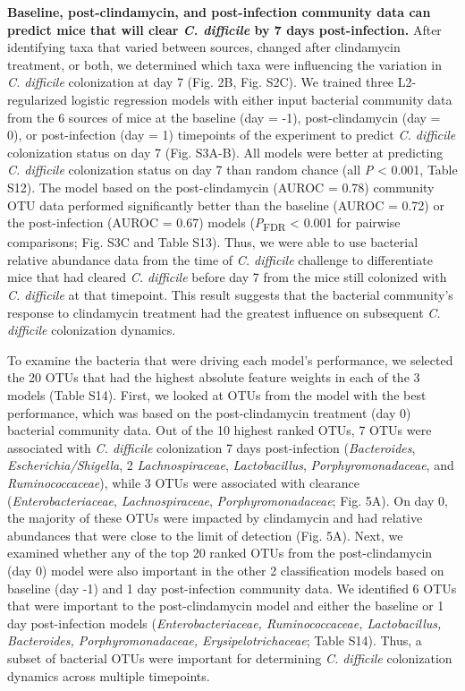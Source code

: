 \documentclass[
  11pt,
]{article}
\begin{document}
\textbf{Baseline, post-clindamycin, and post-infection community data
can predict mice that will clear \emph{C. difficile} by 7 days
post-infection.} After identifying taxa that varied between sources,
changed after clindamycin treatment, or both, we determined which taxa
were influencing the variation in \emph{C. difficile} colonization at
day 7 (Fig. 2B, Fig. S2C). We trained three L2-regularized logistic
regression models with either input bacterial community data from the 6
sources of mice at the baseline (day = -1), post-clindamycin (day = 0),
or post-infection (day = 1) timepoints of the experiment to predict
\emph{C. difficile} colonization status on day 7 (Fig. S3A-B). All
models were better at predicting \emph{C. difficile} colonization status
on day 7 than random chance (all \emph{P} \textless{} 0.001, Table S12).
The model based on the post-clindamycin (AUROC = 0.78) community OTU
data performed significantly better than the baseline (AUROC = 0.72) or
the post-infection (AUROC = 0.67) models (\emph{P}\textsubscript{FDR}
\textless{} 0.001 for pairwise comparisons; Fig. S3C and Table S13).
Thus, we were able to use bacterial relative abundance data from the
time of \emph{C. difficile} challenge to differentiate mice that had
cleared \emph{C. difficile} before day 7 from the mice still colonized
with \emph{C. difficile} at that timepoint. This result suggests that
the bacterial community's response to clindamycin treatment had the
greatest influence on subsequent \emph{C. difficile} colonization
dynamics.

To examine the bacteria that were driving each model's performance, we
selected the 20 OTUs that had the highest absolute feature weights in
each of the 3 models (Table S14). First, we looked at OTUs from the
model with the best performance, which was based on the post-clindamycin
treatment (day 0) bacterial community data. Out of the 10 highest ranked
OTUs, 7 OTUs were associated with \emph{C. difficile} colonization 7
days post-infection (\emph{Bacteroides}, \emph{Escherichia/Shigella}, 2
\emph{Lachnospiraceae}, \emph{Lactobacillus}, \emph{Porphyromonadaceae},
and \emph{Ruminococcaceae}), while 3 OTUs were associated with clearance
(\emph{Enterobacteriaceae}, \emph{Lachnospiraceae},
\emph{Porphyromonadaceae}; Fig. 5A). On day 0, the majority of these
OTUs were impacted by clindamycin and had relative abundances that were
close to the limit of detection (Fig. 5A). Next, we examined whether any
of the top 20 ranked OTUs from the post-clindamycin (day 0) model were
also important in the other 2 classification models based on baseline
(day -1) and 1 day post-infection community data. We identified 6 OTUs
that were important to the post-clindamycin model and either the
baseline or 1 day post-infection models (\emph{Enterobacteriaceae,
Ruminococcaceae, Lactobacillus, Bacteroides, Porphyromonadaceae,
Erysipelotrichaceae}; Table S14). Thus, a subset of bacterial OTUs were
important for determining \emph{C. difficile} colonization dynamics
across multiple timepoints.
\end{document}

